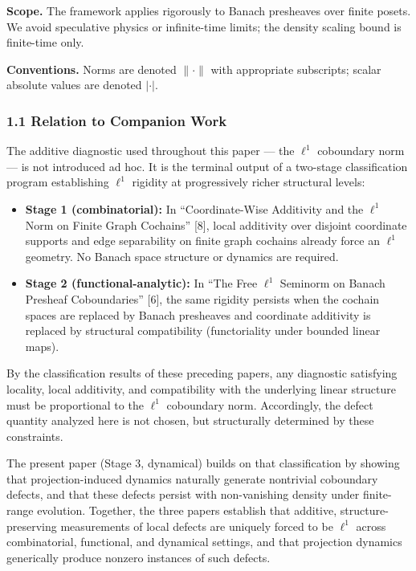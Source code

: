\documentclass[
]{article}
\providecommand{\tightlist}{%
  \setlength{\itemsep}{0pt}\setlength{\parskip}{0pt}}
\begin{document}
\textbf{Scope.} The framework applies rigorously to Banach presheaves
over finite posets. We avoid speculative physics or infinite-time
limits; the density scaling bound is finite-time only.

\textbf{Conventions.} Norms are denoted \(\lVert \cdot \rVert\) with
appropriate subscripts; scalar absolute values are denoted \(|\cdot|\).

\subsubsection{1.1 Relation to Companion
Work}\label{relation-to-companion-work}

The additive diagnostic used throughout this paper --- the \(\ell^1\)
coboundary norm --- is not introduced ad hoc. It is the terminal output
of a two-stage classification program establishing \(\ell^1\) rigidity
at progressively richer structural levels:

\begin{itemize}
\tightlist
\item
  \textbf{Stage 1 (combinatorial):} In ``Coordinate-Wise Additivity and
  the \(\ell^1\) Norm on Finite Graph Cochains'' {[}8{]}, local
  additivity over disjoint coordinate supports and edge separability on
  finite graph cochains already force an \(\ell^1\) geometry. No Banach
  space structure or dynamics are required.
\item
  \textbf{Stage 2 (functional-analytic):} In ``The Free \(\ell^1\)
  Seminorm on Banach Presheaf Coboundaries'' {[}6{]}, the same rigidity
  persists when the cochain spaces are replaced by Banach presheaves and
  coordinate additivity is replaced by structural compatibility
  (functoriality under bounded linear maps).
\end{itemize}

By the classification results of these preceding papers, any diagnostic
satisfying locality, local additivity, and compatibility with the
underlying linear structure must be proportional to the \(\ell^1\)
coboundary norm. Accordingly, the defect quantity analyzed here is not
chosen, but structurally determined by these constraints.

The present paper (Stage 3, dynamical) builds on that classification by
showing that projection-induced dynamics naturally generate nontrivial
coboundary defects, and that these defects persist with non-vanishing
density under finite-range evolution. Together, the three papers
establish that additive, structure-preserving measurements of local
defects are uniquely forced to be \(\ell^1\) across combinatorial,
functional, and dynamical settings, and that projection dynamics
generically produce nonzero instances of such defects.
\end{document}
